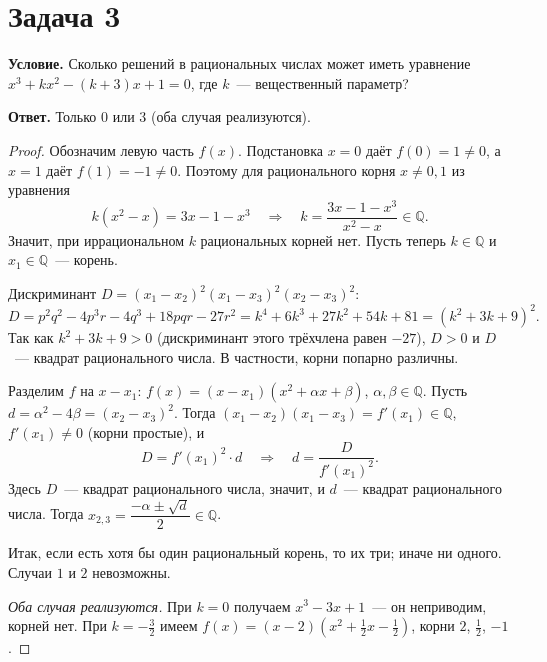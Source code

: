 \documentclass[12pt]{article}
\begin{document}


	\section*{Задача 3}

	\noindent
	\textbf{Условие.} Сколько решений в рациональных числах может иметь уравнение $x^3 + kx^2 - (k+3)x + 1 = 0$, где $k$~--- вещественный параметр?

	\noindent
	\textbf{Ответ.} Только $0$ или $3$ (оба случая реализуются).

	\begin{proof}
		Обозначим левую часть $f(x)$. Подстановка $x = 0$ даёт $f(0) = 1 \neq 0$, а $x = 1$ даёт $f(1) = -1 \neq 0$. Поэтому для рационального корня $x \ne 0, 1$ из уравнения
		\[
			k(x^2 - x) = 3x - 1 - x^3 \quad \Longrightarrow \quad k = \frac{3x - 1 - x^3}{x^2 - x} \in \mathbb{Q}.
		\]
		Значит, при иррациональном $k$ рациональных корней нет. Пусть теперь $k \in \mathbb{Q}$ и $x_1 \in \mathbb{Q}$~--- корень.

		Дискриминант $D = (x_1 - x_2)^2(x_1 - x_3)^2(x_2 - x_3)^2$:
		\[
			D = p^2q^2 - 4p^3r - 4q^3 + 18pqr - 27r^2 = k^4 + 6k^3 + 27k^2 + 54k + 81 = (k^2 + 3k + 9)^2.
		\]
		Так как $k^2 + 3k + 9 > 0$ (дискриминант этого трёхчлена равен $-27$), $D > 0$ и $D$~--- квадрат рационального числа. В частности, корни попарно различны.

		Разделим $f$ на $x - x_1$: $f(x) = (x - x_1)(x^2 + \alpha x + \beta)$, $\alpha, \beta \in \mathbb{Q}$. Пусть $d = \alpha^2 - 4\beta = (x_2 - x_3)^2$. Тогда $(x_1 - x_2)(x_1 - x_3) = f'(x_1) \in \mathbb{Q}$, $f'(x_1) \neq 0$ (корни простые), и
		\[
			D = f'(x_1)^2 \cdot d \quad \Longrightarrow \quad d = \frac{D}{f'(x_1)^2}.
		\]
		Здесь $D$~--- квадрат рационального числа, значит, и $d$~--- квадрат рационального числа. Тогда $x_{2,3} = \dfrac{-\alpha \pm \sqrt d}{2} \in \mathbb{Q}$.

		Итак, если есть хотя бы один рациональный корень, то их три; иначе ни одного. Случаи $1$ и $2$ невозможны.

		\emph{Оба случая реализуются.} При $k = 0$ получаем $x^3 - 3x + 1$~--- он неприводим, корней нет. При $k = -\tfrac32$ имеем $f(x) = (x - 2)\left(x^2 + \tfrac12 x - \tfrac12\right)$, корни $2$, $\tfrac12$, $-1$.
	\end{proof}
\end{document}
